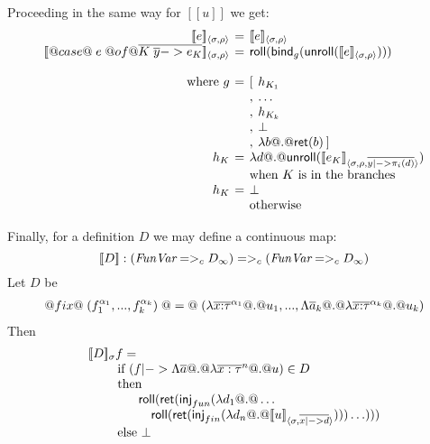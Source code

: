 \documentclass[preprint,nocopyrightspace]{sigplanconf}
\begin{document}
Proceeding in the same way for $[\![u]\!]$ we get:
\[\setlength{\arraycolsep}{2pt}
  \begin{array}{rcll}
  \interp{e}{\sigma}{\rho} & = & \multicolumn{2}{l}{\interp{e}{\sigma}{\rho}} \\ 
  \interp{@case@\;e\;@of@ \ol{ K\;\ys -> e_K}}{\sigma}{\rho} & = & \multicolumn{2}{l}{\roll(\bind_{g} (\unroll(\interp{e}{\sigma}{\rho})))} \\ \\ 
  \text{ where } g  & = & [ & h_{K_1} \\
                    &   & , & \ldots \\
                    &   & , & h_{K_k} \\
                    &   & , & \bot \\ 
                    &   & , & \dlambda b @.@ \ret(b) \hspace{2pt} ] \\ 
              h_{K} & =  & \multicolumn{2}{l}{\dlambda d @.@ \unroll(\interp{e_K}{\sigma}{\rho, \ol{y |-> \pi_i(d)}})} \\ 
                    &   & \multicolumn{2}{l}{\text{when } K \text{ is in the branches}} \\
              h_{K}  & = & \multicolumn{2}{l}{\bot } \\ 
                    &   & \multicolumn{2}{l}{\text{otherwise}}                  
\end{array}\]

Finally, for a definition $D$ we may define a continuous map:
\[ 
        [\![D]\!] : (\textit{FunVar} =>_c D_{\infty}) =>_c (\textit{FunVar} =>_c D_{\infty}) 
\]
Let $D$ be 
\[\begin{array}{l} 
     @fix@\;(f_1^{\alpha_1},...,f_k^{\alpha_k})\;@=@\; 
     (\lambda{\overline{x{:}\tau}^{\alpha_1}} @.@ u_1,...,
                   \Lambda\overline{a}_k @.@ \lambda{\overline{x{:}\tau}^{\alpha_k}} @.@ u_k) 
\end{array}\] 
Then
\[\begin{array}{l}  
   [\![D]\!]_{\sigma} f =  \\ 
     \qquad\mbox{ if } (f |-> \Lambda\overline{a} @.@ \lambda\overline{x:\tau}^{n} @.@ u) \in D \\
     \qquad\mbox{ then } \\
     \qquad\quad\quad \mathsf{roll}(\mathsf{ret}(\mathsf{inj}_{fun}(\mathsf{\lambda} d_1 @.@ \ldots  \\
     \qquad\quad\quad\quad \mathsf{roll}(\mathsf{ret}(\mathsf{inj}_{fin}(\mathsf{\lambda} d_n @.@ [\![u]\!]_{\langle {\sigma},{\overline{x |-> d}}\rangle})))\ldots))) \\
     \qquad \mbox{ else } \bot
\end{array}\]
\end{document}
